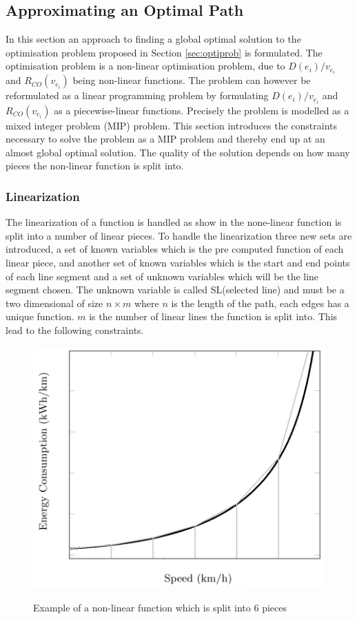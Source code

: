 
\subsection{Approximating an Optimal Path}\label{sec:LP}
In this section an approach to finding a global optimal solution to the optimisation problem proposed in Section \ref{sec:optiprob} is formulated. The optimisation problem is a non-linear optimisation problem, due to \( D(e_i)/v_{e_i} \) and $R_{CO}(v_{e_i})$ being non-linear functions. The problem can however be reformulated as a linear programming problem by formulating \( D(e_i)/v_{e_i} \) and $R_{CO}(v_{e_i})$ as a piecewise-linear functions. Precisely the problem is modelled as a mixed integer problem (MIP) problem. This section introduces the constraints necessary to solve the problem as a MIP problem and thereby end up at an almost global optimal solution. The quality of the solution depends on how many pieces the non-linear function is split into. 

\subsubsection{Linearization}
The linearization of a function is handled as show in  the none-linear function is split into a number of linear pieces. To handle the linearization three new sets are introduced, a set of known variables which is the pre computed function of each linear piece, and another set of known variables which is the start and end points of each line segment and a set of unknown variables which will be the line segment chosen. The unknown variable is called SL(selected line) and must be a two dimensional of size $n \times m$ where $n$ is the length of the path, each edges has a unique function. $m$ is the number of linear lines the function is split into. This lead to the following constraints.  

\begin{figure}[h!]
\centering
\includegraphics[scale=0.33]{images/linearization_example}
\label{fig:linearization_example}
\caption{Example of a non-linear function which is split into 6 pieces}
\end{figure}

